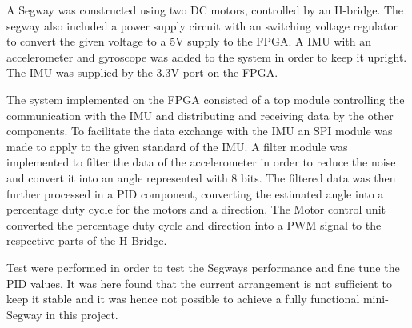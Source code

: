 A Segway was constructed using two DC motors, controlled by an H-bridge.
The segway also included a power supply circuit with an switching voltage regulator to convert the given voltage to a 5V supply to the FPGA.
A IMU with an accelerometer and gyroscope was added to the system in order to keep it upright.
The IMU was supplied by the 3.3V port on the FPGA.

The system implemented on the FPGA consisted of a top module controlling the communication with the IMU and distributing and receiving data by the other components.
To facilitate the data exchange with the IMU an SPI module was made to apply to the given standard of the IMU.
A filter module was implemented to filter the data of the accelerometer in order to reduce the noise and convert it into an angle represented with 8 bits.
The filtered data was then further processed in a PID component, converting the estimated angle into a percentage duty cycle for the motors and a direction.
The Motor control unit converted the percentage duty cycle and direction into a PWM signal to the respective parts of the H-Bridge.

Test were performed in order to test the Segways performance and fine tune the PID values.
It was here found that the current arrangement is not sufficient to keep it stable and it was hence not possible to achieve a fully functional mini-Segway in this project.